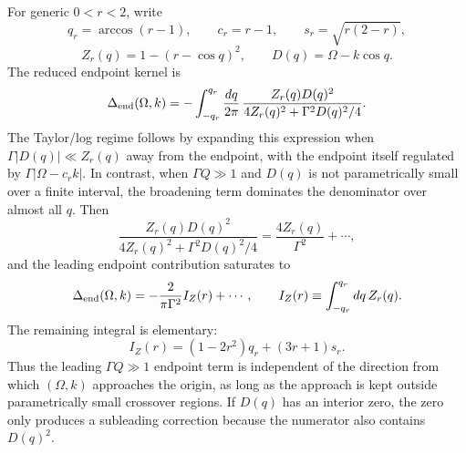 \documentclass[aps,prx,preprint,amsmath,amssymb]{revtex4-2}
\begin{document}
For generic \(0<r<2\), write
\[
q_r=\arccos(r-1),
\qquad
c_r=r-1,
\qquad
s_r=\sqrt{r(2-r)},
\]
\[
Z_r(q)=1-(r-\cos q)^2,
\qquad
D(q)=\Omega-k\cos q.
\]
The reduced endpoint kernel is
\begin{equation}
\label{eq:largeGamma-endpoint-kernel-app}
\Delta_{\rm end}(\Omega,k)
=
-\int_{-q_r}^{q_r}\frac{dq}{2\pi}\,
\frac{Z_r(q)D(q)^2}
{4Z_r(q)^2+\Gamma^2D(q)^2/4}.
\end{equation}
The Taylor/log regime follows by expanding this expression when
\(\Gamma|D(q)|\ll Z_r(q)\) away from the endpoint, with the endpoint itself
regulated by \(\Gamma|\Omega-c_rk|\).  In contrast, when
\(\Gamma Q\gg1\) and \(D(q)\) is not parametrically small over a finite interval,
the broadening term dominates the denominator over almost all \(q\).  Then
\begin{equation}
\frac{Z_r(q)D(q)^2}
{4Z_r(q)^2+\Gamma^2D(q)^2/4}
=
\frac{4Z_r(q)}{\Gamma^2}
+\cdots,
\end{equation}
and the leading endpoint contribution saturates to
\begin{equation}
\label{eq:largeGamma-saturation-app}
\Delta_{\rm end}(\Omega,k)
=
-\frac{2}{\pi\Gamma^2}I_Z(r)+\cdots,
\qquad
I_Z(r)\equiv\int_{-q_r}^{q_r}dq\,Z_r(q).
\end{equation}
The remaining integral is elementary:
\begin{equation}
\label{eq:Iz-generic-r-app}
I_Z(r)
=
(1-2r^2)q_r+(3r+1)s_r.
\end{equation}
Thus the leading \(\Gamma Q\gg1\) endpoint term is independent of the direction
from which \((\Omega,k)\) approaches the origin, as long as the approach is
kept outside parametrically small crossover regions.  If \(D(q)\) has an
interior zero, the zero only produces a subleading correction because the
numerator also contains \(D(q)^2\).
\end{document}
